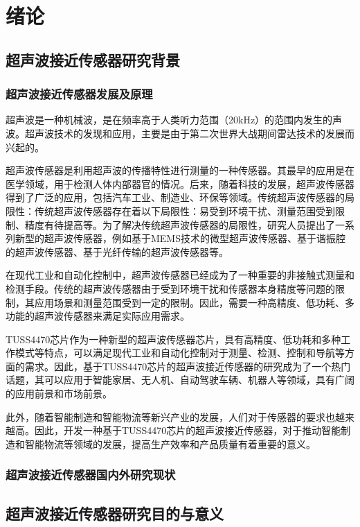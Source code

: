 	\newpage
	\section{绪论}
    \subsection{超声波接近传感器研究背景}
    \subsubsection{超声波接近传感器发展及原理}

超声波是一种机械波，是在频率高于人类听力范围（20kHz）的范围内发生的声波。超声波技术的发现和应用，主要是由于第二次世界大战期间雷达技术的发展而兴起的。\par
超声波传感器是利用超声波的传播特性进行测量的一种传感器。其最早的应用是在医学领域，用于检测人体内部器官的情况。后来，随着科技的发展，超声波传感器得到了广泛的应用，包括汽车工业、制造业、环保等领域。传统超声波传感器的局限性：传统超声波传感器存在着以下局限性：易受到环境干扰、测量范围受到限制、精度有待提高等。为了解决传统超声波传感器的局限性，研究人员提出了一系列新型的超声波传感器，例如基于MEMS技术的微型超声波传感器、基于谐振腔的超声波传感器、基于光纤传输的超声波传感器等。

在现代工业和自动化控制中，超声波传感器已经成为了一种重要的非接触式测量和检测手段。传统的超声波传感器由于受到环境干扰和传感器本身精度等问题的限制，其应用场景和测量范围受到一定的限制。因此，需要一种高精度、低功耗、多功能的超声波传感器来满足实际应用需求。\par
TUSS4470芯片作为一种新型的超声波传感器芯片，具有高精度、低功耗和多种工作模式等特点，可以满足现代工业和自动化控制对于测量、检测、控制和导航等方面的需求。因此，基于TUSS4470芯片的超声波接近传感器的研究成为了一个热门话题，其可以应用于智能家居、无人机、自动驾驶车辆、机器人等领域，具有广阔的应用前景和市场前景。\par
此外，随着智能制造和智能物流等新兴产业的发展，人们对于传感器的要求也越来越高。因此，开发一种基于TUSS4470芯片的超声波接近传感器，对于推动智能制造和智能物流等领域的发展，提高生产效率和产品质量有着重要的意义。
   
    \subsubsection{超声波接近传感器国内外研究现状}
    \subsection{超声波接近传感器研究目的与意义}

